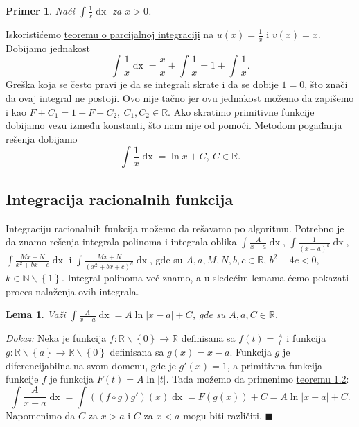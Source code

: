 \documentclass{article}
\newtheorem{lema}{Lema}[section]
\newtheorem{prim}{Primer}[section]
\DeclareMathOperator{\dx}{dx}
\begin{document}
\begin{primbox}
    \label{primer_1.14}
    \begin{prim}
        Naći $\displaystyle\int \frac{1}{x} \dx$ za $x > 0$.
    \end{prim}
    Iskoristićemo \hyperref[teorema_1.4]{teoremu o parcijalnoj integraciji} na $\displaystyle u\left(x\right)  = \frac{1}{x}$ i
    $v\left(x\right) = x$.
    Dobijamo jednakost
    $$\int \frac{1}{x} \dx = \frac{x}{x} + \int \frac{1}{x} = 1+ \int\frac{1}{x}.$$
    Greška koja se često pravi je da se integrali skrate i da se dobije $1 = 0$, što znači da ovaj integral ne postoji.
    Ovo nije tačno jer ovu jednakost možemo da zapišemo i kao $F+C_1 = 1+F+C_2,\ C_1,C_2\in\mathbb{R}$.
    Ako skratimo primitivne funkcije dobijamo vezu između konstanti, što nam nije od pomoći. Metodom pogađanja
    rešenja dobijamo $$\int\frac{1}{x}\dx=\ln x+C,\ C\in\mathbb{R}.$$
\end{primbox}

\subsection{Integracija racionalnih funkcija}

Integraciju racionalnih funkcija možemo da rešavamo po algoritmu.
Potrebno je da znamo rešenja integrala polinoma i integrala
oblika
$\displaystyle\int \frac{A}{x-a}\dx$, $\displaystyle\int\frac{1}{\left(x-a\right)^k}\dx$,
$\displaystyle\int \frac{Mx+N}{x^2+bx + c}\dx$ i $\displaystyle\int \frac{Mx + N}{\left(x^2 + bx + c\right)^k}\dx$,
gde su $A,a,M,N,b,c\in\mathbb{R}$, $b^2-4c<0$, $k\in\mathbb{N}\backslash\left\{1\right\}$.
Integral polinoma već znamo, a u sledećim lemama ćemo
pokazati proces nalaženja ovih integrala.

\begin{lemabox}
    \label{lema_1.1}
    \begin{lema}
        Važi $\displaystyle\int \frac{A}{x-a}\dx=A\ln|x-a| + C$, gde su $A,a,C\in \mathbb{R}$.
    \end{lema}
\end{lemabox}

\textit{Dokaz:} Neka je funkcija $f:\mathbb{R}\backslash\left\{0\right\}\longrightarrow\mathbb{R}$ definisana sa
$\displaystyle f\left(t\right)=\frac{A}{t}$ i funkcija $g:\mathbb{R}\backslash\left\{a\right\}\longrightarrow\mathbb{R}\backslash\left\{0\right\}$
definisana sa $g\left(x\right)=x-a$. Funkcija $g$ je diferencijabilna na svom domenu, gde je $g'\left(x\right)=1$, a primitivna funkcija
funkcije $f$ je funkcija $F\left(t\right)=A\ln|t|$. Tada možemo da primenimo \hyperref[teorema_1.2]{teoremu 1.2}:
$$ \int \frac{A}{x-a}\dx = \int \left(\left(f\circ g\right) g'\right)\left(x\right)\dx = F\left(g\left(x\right)\right) + C=A\ln|x-a| + C.$$
Napomenimo da $C$ za $x > a$ i $C$ za $x < a$ mogu biti različiti.
\null\hfill $\blacksquare$\par
\end{document}
